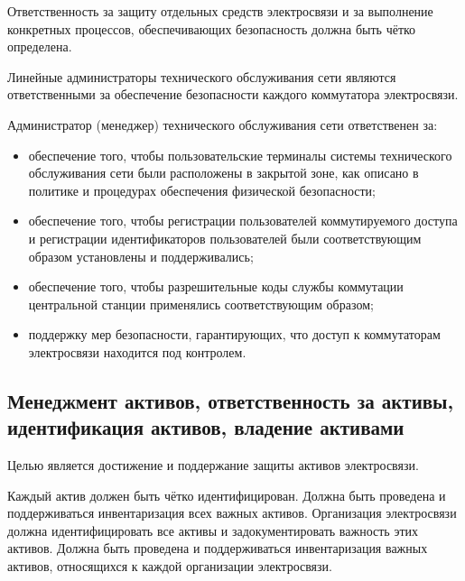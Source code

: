 \documentclass[12pt, russian, oneside, article]{ncc}
\begin{document}
Ответственность за защиту отдельных средств электросвязи и за выполнение конкретных процессов, обеспечивающих безопасность должна быть чётко определена.

Линейные администраторы технического обслуживания сети являются ответственными за обеспечение безопасности каждого коммутатора электросвязи.

Администратор (менеджер) технического обслуживания сети ответственен за:
\begin{itemize}
\item обеспечение того, чтобы пользовательские терминалы системы технического обслуживания сети были расположены в закрытой зоне, как описано в политике и процедурах обеспечения физической безопасности;
\item обеспечение того, чтобы регистрации пользователей коммутируемого доступа и регистрации идентификаторов пользователей были соответствующим образом установлены и поддерживались;
\item обеспечение того, чтобы разрешительные коды службы коммутации центральной станции применялись соответствующим образом;
\item поддержку мер безопасности, гарантирующих, что доступ к коммутаторам электросвязи находится под контролем.
\end{itemize}
\subsection{Менеджмент активов, ответственность за активы, идентификация активов, владение активами}
\label{sec-5_2}


Целью является достижение и поддержание защиты активов электросвязи.

Каждый актив должен быть чётко идентифицирован. Должна быть проведена и поддерживаться инвентаризация всех важных активов. Организация электросвязи должна идентифицировать все активы и задокументировать важность этих активов. Должна быть проведена и поддерживаться инвентаризация важных активов, относящихся к каждой организации электросвязи.
\end{document}
